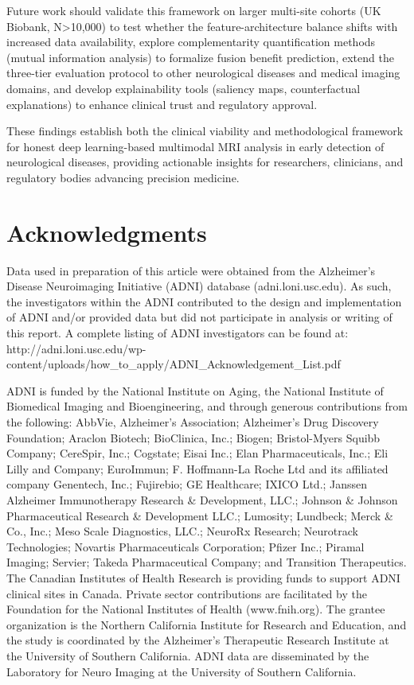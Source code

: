\documentclass[conference]{IEEEtran}
\begin{document}
Future work should validate this framework on larger multi-site cohorts (UK Biobank, N>10,000) to test whether the feature-architecture balance shifts with increased data availability, explore complementarity quantification methods (mutual information analysis) to formalize fusion benefit prediction, extend the three-tier evaluation protocol to other neurological diseases and medical imaging domains, and develop explainability tools (saliency maps, counterfactual explanations) to enhance clinical trust and regulatory approval.

These findings establish both the clinical viability and methodological framework for honest deep learning-based multimodal MRI analysis in early detection of neurological diseases, providing actionable insights for researchers, clinicians, and regulatory bodies advancing precision medicine.

\section*{Acknowledgments}

Data used in preparation of this article were obtained from the Alzheimer's Disease Neuroimaging Initiative (ADNI) database (adni.loni.usc.edu). As such, the investigators within the ADNI contributed to the design and implementation of ADNI and/or provided data but did not participate in analysis or writing of this report. A complete listing of ADNI investigators can be found at: http://adni.loni.usc.edu/wp-content/uploads/how\_to\_apply/ADNI\_Acknowledgement\_List.pdf

ADNI is funded by the National Institute on Aging, the National Institute of Biomedical Imaging and Bioengineering, and through generous contributions from the following: AbbVie, Alzheimer's Association; Alzheimer's Drug Discovery Foundation; Araclon Biotech; BioClinica, Inc.; Biogen; Bristol-Myers Squibb Company; CereSpir, Inc.; Cogstate; Eisai Inc.; Elan Pharmaceuticals, Inc.; Eli Lilly and Company; EuroImmun; F. Hoffmann-La Roche Ltd and its affiliated company Genentech, Inc.; Fujirebio; GE Healthcare; IXICO Ltd.; Janssen Alzheimer Immunotherapy Research \& Development, LLC.; Johnson \& Johnson Pharmaceutical Research \& Development LLC.; Lumosity; Lundbeck; Merck \& Co., Inc.; Meso Scale Diagnostics, LLC.; NeuroRx Research; Neurotrack Technologies; Novartis Pharmaceuticals Corporation; Pfizer Inc.; Piramal Imaging; Servier; Takeda Pharmaceutical Company; and Transition Therapeutics. The Canadian Institutes of Health Research is providing funds to support ADNI clinical sites in Canada. Private sector contributions are facilitated by the Foundation for the National Institutes of Health (www.fnih.org). The grantee organization is the Northern California Institute for Research and Education, and the study is coordinated by the Alzheimer's Therapeutic Research Institute at the University of Southern California. ADNI data are disseminated by the Laboratory for Neuro Imaging at the University of Southern California.
\end{document}

